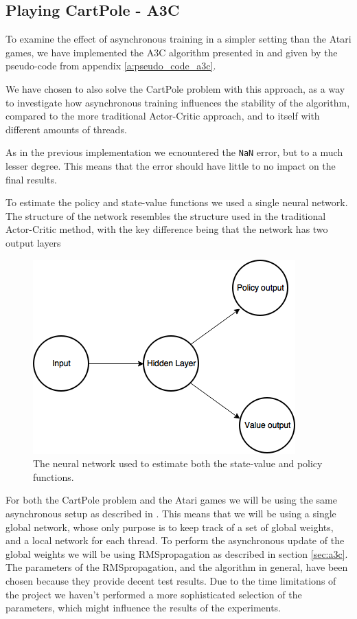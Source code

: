 \documentclass[11pt]{article}
\begin{document}
\subsection{Playing CartPole - A3C}

To examine the effect of asynchronous training in a simpler setting than
the Atari games, we have implemented the A3C algorithm presented
in \cite{a3c} and given by the pseudo-code from appendix \ref{a:pseudo_code_a3c}.

We have chosen to also solve the CartPole problem with this approach, as a way to
investigate how asynchronous training influences the stability of the algorithm,
compared to the more traditional Actor-Critic approach, and 
to itself with different amounts of threads.

As in the previous implementation we ecnountered the \texttt{NaN} error,
but to a much lesser degree.
This means that the error should have little to no impact on
the final results.

To estimate the policy and state-value functions we used a single
neural network.
The structure of the network resembles the structure used in the traditional
Actor-Critic method, with the key difference being that the network has
two output layers

\begin{figure}[H]
    \centering
    \includegraphics[scale=0.5]{include/shared_cartpole.png}
    \caption{The neural network used to estimate both the state-value
             and policy functions.}
    \label{fig:s_cartpole}
\end{figure}

For both the CartPole problem and the Atari games we will be using the same asynchronous setup
as described in \cite{a3c}.
This means that we will be using a single global network, whose only
purpose is to keep track of a set of global weights, and a local network
for each thread.
To perform the asynchronous update of the global weights we will be using
RMSpropagation as described in section \ref{sec:a3c}.
The parameters of the RMSpropagation, and the algorithm in general, have
been chosen because they provide decent test results.
Due to the time limitations of the project we haven't performed
a more sophisticated selection of the parameters, which might
influence the results of the experiments.
\end{document}
